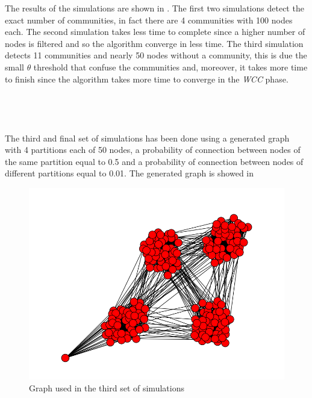 \documentclass[12pt]{article}
\begin{document}
 The results of the simulations are shown in . The first two simulations detect the exact number of communities, in fact there are 4 communities with 100 nodes each. The second simulation takes less time to complete since a higher number of nodes is filtered and so the algorithm converge in less time. The third simulation detects 11 communities and nearly 50 nodes without a community, this is due the small $\theta$ threshold that confuse the communities and, moreover, it takes more time to finish since the algorithm takes more time to converge in the \emph{WCC} phase.
\\
\\
\\
\\
\\
The third and final set of simulations has been done using a generated graph  with 4 partitions each of 50 nodes, a probability of connection between nodes of the same partition equal to 0.5 and a probability of connection between nodes of different partitions equal to 0.01. The generated graph is showed in 
     \begin{figure}[H]
       \centering
         \includegraphics[width=1\textwidth]{Graph200.png}
       \caption{Graph used in the third set of simulations}
       \label{fig:Graph200}
     \end{figure}
\end{document}
